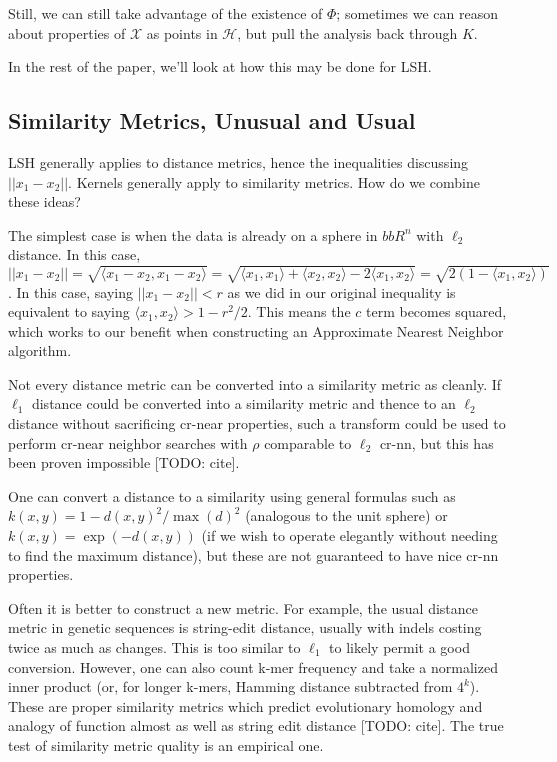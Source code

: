 \documentclass[twoside,11pt]{homework}
\begin{document}
Still, we can still take advantage of the existence of $\Phi$; sometimes we can reason about properties of $\mathcal{X}$ as points in $\mathcal{H}$, but pull the analysis back through $K$.

In the rest of the paper, we'll look at how this may be done for LSH.

\subsection{Similarity Metrics, Unusual and Usual} %
  
LSH generally applies to distance metrics, hence the inequalities
discussing $||x_1-x_2||$.  Kernels generally apply to similarity
metrics.  How do we combine these ideas?

The simplest case is when the data is already on a sphere in $bbR^n$
with $\ell_2$ distance.  In this case, $||x_1-x_2||=\sqrt{\langle
  x_1-x_2, x_1-x_2 \rangle}=\sqrt{\langle x_1,x_1 \rangle+\langle
  x_2,x_2 \rangle - 2 \langle x_1,x_2 \rangle} = \sqrt{2(1-\langle
  x_1,x_2 \rangle)}$.  In this case, saying $||x_1-x_2||<r$ as we did
in our original inequality is equivalent to saying $\langle x_1,x_2
\rangle > 1-r^2/2$.  This means the $c$ term becomes squared, which
works to our benefit when constructing an Approximate Nearest Neighbor
algorithm.

Not every distance metric can be converted into a similarity metric as
cleanly.  If $\ell_1$ distance could be converted into a similarity
metric and thence to an $\ell_2$ distance without sacrificing cr-near
properties, such a transform could be used to perform cr-near neighbor
searches with $\rho$ comparable to $\ell_2$ cr-nn, but this has been
proven impossible [TODO: cite].

One can convert a distance to a similarity using general formulas such
as $k(x,y)=1-d(x,y)^2/\max(d)^2$ (analogous to the unit sphere) or
$k(x,y)=\exp(-d(x,y))$ (if we wish to operate elegantly without
needing to find the maximum distance), but these are not guaranteed to
have nice cr-nn properties.

Often it is better to construct a new metric.  For example, the usual
distance metric in genetic sequences is string-edit distance, usually
with indels costing twice as much as changes.  This is too similar to
$\ell_1$ to likely permit a good conversion.  However, one can also
count k-mer frequency and take a normalized inner product (or, for
longer k-mers, Hamming distance subtracted from $4^k$).  These are
proper similarity metrics which predict evolutionary homology and
analogy of function almost as well as string edit distance [TODO:
  cite].  The true test of similarity metric quality is an empirical
one.
\end{document}
